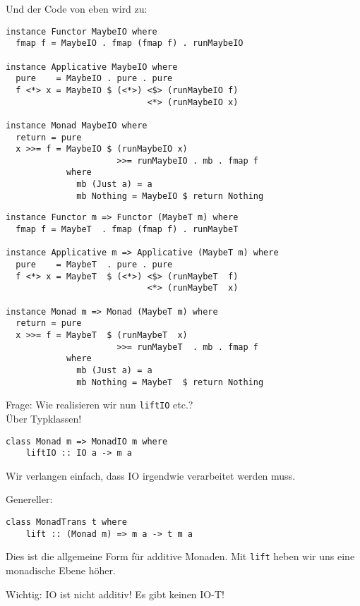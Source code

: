 \documentclass{beamer}
\begin{document}
\begin{frame}[fragile]
\begin{overprint}
Und der Code von eben
wird zu:
\end{overprint}
\begin{overprint}
\begin{verbatim}
instance Functor MaybeIO where
  fmap f = MaybeIO . fmap (fmap f) . runMaybeIO

instance Applicative MaybeIO where
  pure    = MaybeIO . pure . pure
  f <*> x = MaybeIO $ (<*>) <$> (runMaybeIO f)
                            <*> (runMaybeIO x)

instance Monad MaybeIO where
  return = pure
  x >>= f = MaybeIO $ (runMaybeIO x)
                      >>= runMaybeIO . mb . fmap f
            where
              mb (Just a) = a
              mb Nothing = MaybeIO $ return Nothing
\end{verbatim}
\begin{verbatim}
instance Functor m => Functor (MaybeT m) where
  fmap f = MaybeT  . fmap (fmap f) . runMaybeT

instance Applicative m => Applicative (MaybeT m) where
  pure    = MaybeT  . pure . pure
  f <*> x = MaybeT  $ (<*>) <$> (runMaybeT  f)
                            <*> (runMaybeT  x)

instance Monad m => Monad (MaybeT m) where
  return = pure
  x >>= f = MaybeT  $ (runMaybeT  x)
                      >>= runMaybeT  . mb . fmap f
            where
              mb (Just a) = a
              mb Nothing = MaybeT  $ return Nothing
\end{verbatim}
\end{overprint}
\end{frame}

\begin{frame}[fragile]
Frage: Wie realisieren wir nun \texttt{liftIO} etc.?\\
\pause
Über Typklassen!
\begin{verbatim}
class Monad m => MonadIO m where
    liftIO :: IO a -> m a
\end{verbatim}
Wir verlangen einfach, dass IO irgendwie verarbeitet werden muss.\par
\pause
Genereller:
\begin{verbatim}
class MonadTrans t where
    lift :: (Monad m) => m a -> t m a
\end{verbatim}
\pause
Dies ist die allgemeine Form für additive Monaden. Mit \texttt{lift} heben wir uns eine monadische Ebene höher.\\
\pause
\begin{important}
Wichtig: IO ist nicht additiv! Es gibt keinen IO-T!
\end{important}
\end{frame}
\end{document}
